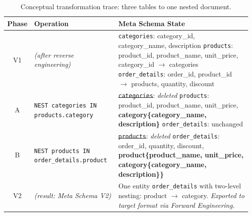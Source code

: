   \begin{table}[t]
  \centering
  \caption{Conceptual transformation trace: three tables to one nested document.}
  \label{tab:transformation-trace}
  \renewcommand{\arraystretch}{1.3}
  \setlength{\tabcolsep}{4pt}
  \scriptsize
  \begin{tabular}{cp{4.5cm}p{6.5cm}}
  \toprule
  \textbf{Phase} & \textbf{Operation} & \textbf{Meta Schema State} \\
  \midrule
  V1 & \emph{(after reverse engineering)} &
  \texttt{categories}: category\_id, category\_name, description \newline
  \texttt{products}: product\_id, product\_name, unit\_price, category\_id $\to$ categories \newline
  \texttt{order\_details}: order\_id, product\_id $\to$ products, quantity, discount \\
  \midrule
  A & \texttt{NEST categories IN products.category} &
  \sout{\texttt{categories}}: \emph{deleted} \newline
  \texttt{products}: product\_id, product\_name, unit\_price, \textbf{category\{category\_name, description\}} \newline
  \texttt{order\_details}: unchanged \\
  \midrule
  B & \texttt{NEST products IN order\_details.product } &
  \sout{\texttt{products}}: \emph{deleted} \newline
  \texttt{order\_details}: order\_id, quantity, discount, \textbf{product\{product\_name, unit\_price, category\{category\_name, description\}\}} \\
  \midrule
  V2 & \emph{(result: Meta Schema V2)} &
  One entity \texttt{order\_details} with two-level nesting: product $\to$ category. \newline
  \emph{Exported to target format via Forward Engineering.} \\
  \bottomrule
  \end{tabular}
  \end{table}


